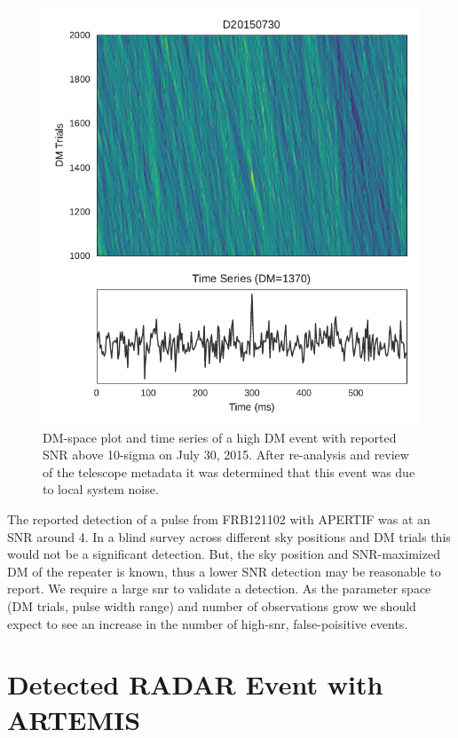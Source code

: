 \documentclass[a4paper,fleqn,usenatbib]{mnras}
\begin{document}
\begin{figure}
    \includegraphics[width=1.0\linewidth]{figures/D20150730_buf23_Beam6_dmtrial.pdf}
    \caption{DM-space plot and time series of a high DM event with reported SNR
    above 10-sigma on July 30, 2015. After re-analysis and review of the
    telescope metadata it was determined that this event was due to local system
    noise.
    }
    \label{fig:D20150730}
\end{figure}

The reported detection of a pulse from FRB121102 with APERTIF \citep{atel10693}
was at an SNR around 4. In a blind survey across different sky positions and DM
trials this would not be a significant detection. But, the sky position and
SNR-maximized DM of the repeater is known, thus a lower SNR detection may be
reasonable to report.  We require a large \gls{snr} to validate a detection.  As
the parameter space (DM trials, pulse width range) and number of observations
grow we should expect to see an increase in the number of high-\gls{snr},
false-poisitive events.

\section{Detected RADAR Event with ARTEMIS}
\label{sec:LOFAR_RADAR}
\end{document}
